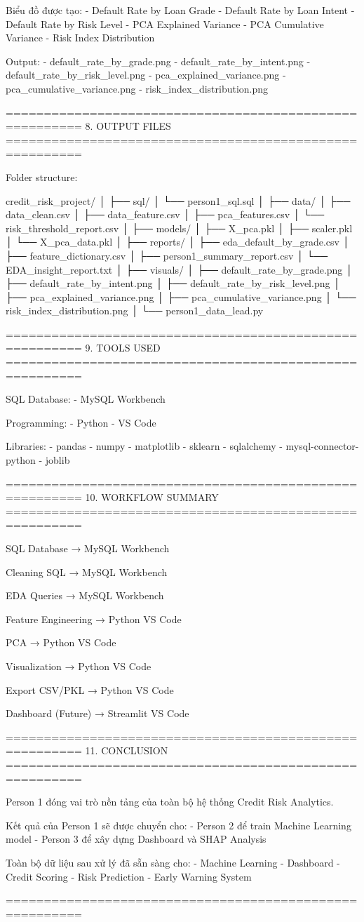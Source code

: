 Biểu đồ được tạo:
- Default Rate by Loan Grade
- Default Rate by Loan Intent
- Default Rate by Risk Level
- PCA Explained Variance
- PCA Cumulative Variance
- Risk Index Distribution

Output:
- default_rate_by_grade.png
- default_rate_by_intent.png
- default_rate_by_risk_level.png
- pca_explained_variance.png
- pca_cumulative_variance.png
- risk_index_distribution.png

========================================================
8. OUTPUT FILES
========================================================

Folder structure:

credit_risk_project/
│
├── sql/
│   └── person1_sql.sql
│
├── data/
│   ├── data_clean.csv
│   ├── data_feature.csv
│   ├── pca_features.csv
│   └── risk_threshold_report.csv
│
├── models/
│   ├── X_pca.pkl
│   ├── scaler.pkl
│   └── X_pca_data.pkl
│
├── reports/
│   ├── eda_default_by_grade.csv
│   ├── feature_dictionary.csv
│   ├── person1_summary_report.csv
│   └── EDA_insight_report.txt
│
├── visuals/
│   ├── default_rate_by_grade.png
│   ├── default_rate_by_intent.png
│   ├── default_rate_by_risk_level.png
│   ├── pca_explained_variance.png
│   ├── pca_cumulative_variance.png
│   └── risk_index_distribution.png
│
└── person1_data_lead.py

========================================================
9. TOOLS USED
========================================================

SQL Database:
- MySQL Workbench

Programming:
- Python
- VS Code

Libraries:
- pandas
- numpy
- matplotlib
- sklearn
- sqlalchemy
- mysql-connector-python
- joblib

========================================================
10. WORKFLOW SUMMARY
========================================================

SQL Database
→ MySQL Workbench

Cleaning SQL
→ MySQL Workbench

EDA Queries
→ MySQL Workbench

Feature Engineering
→ Python VS Code

PCA
→ Python VS Code

Visualization
→ Python VS Code

Export CSV/PKL
→ Python VS Code

Dashboard (Future)
→ Streamlit VS Code

========================================================
11. CONCLUSION
========================================================

Person 1 đóng vai trò nền tảng của toàn bộ hệ thống
Credit Risk Analytics.

Kết quả của Person 1 sẽ được chuyển cho:
- Person 2 để train Machine Learning model
- Person 3 để xây dựng Dashboard và SHAP Analysis

Toàn bộ dữ liệu sau xử lý đã sẵn sàng cho:
- Machine Learning
- Dashboard
- Credit Scoring
- Risk Prediction
- Early Warning System

========================================================